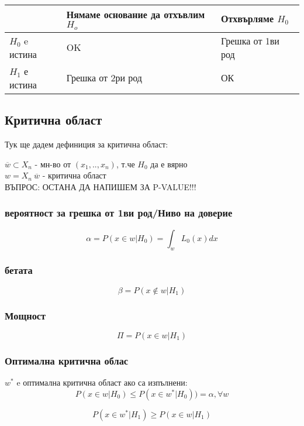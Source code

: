 \documentclass{article}
\begin{document}
\begin{center}
    \begin{tabular}{| l | l | l |}
    \hline
     &  Нямаме основание да отхъвлим $H_o$ & Отхвърляме $H_0$ \\ \hline
    $H_0$ e истина & OK & Грешка от 1ви род \\ \hline
    $H_1$ е истина & Грешка от 2ри род & ОК \\ \hline
    \end{tabular}
\end{center}


\subsection{Критична област}
Тук ще дадем дефиниция за критична област:

$\overline{w} \subset X_n$ - мн-во от $(x_1,..,x_n)$, т.че $H_0$ да е вярно \\

$w = X_n \ \overline{w}$ - критична област \\



ВЪПРОС: ОСТАНА ДА НАПИШЕМ ЗА P-VALUE!!!

\subsubsection{вероятност за грешка от 1ви род/Ниво на доверие}
$$\alpha = P(x \in w|H_{0})=\int_{w} L_{0}(x)dx$$

\subsubsection{бетата}
$$\beta = P(x \notin w | H_{1})$$

\subsubsection{Мощност}
$$\Pi=P(x \in w | H_{1})$$

\subsubsection{Оптимална критична облас}

$w^{*}$ e оптимална критична област ако са изпълнени:
$$P(x \in w | H_{0}) \leq P(x \in w^{*} | H_{0})) = \alpha,\forall w$$

$$P(x \in w^{*} | H_{1}) \geq P(x \in w | H_{1})$$
\end{document}
